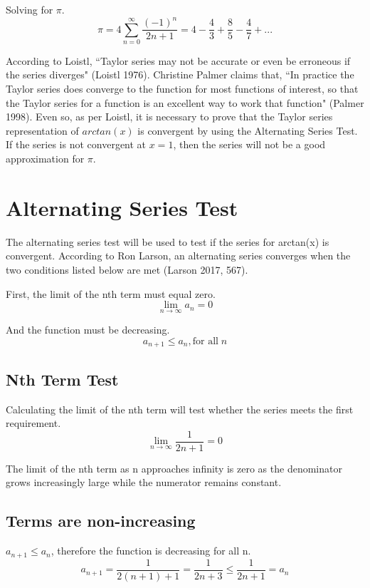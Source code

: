 \documentclass[12pt, titlepage]{article}
\begin{document}
Solving for \(\pi\).
\begin{equation*}
    \pi = 4 \sum_{n=0}^\infty{ \frac{(-1)^n}{2n+1} = 4 - \frac{4}{3} + \frac{8}{5} - \frac{4}{7} + ... }
\end{equation*}

According to Loistl, ``Taylor series may not be accurate or even be erroneous if the series diverges" (Loistl 1976). Christine Palmer claims that, ``In practice the Taylor series does converge to the function for most functions of interest, so that the Taylor series for a function is an excellent way to work that function" (Palmer 1998). Even so, as per Loistl, it is necessary to prove that the Taylor series representation of \(arctan(x)\) is convergent by using the Alternating Series Test. If the series is not convergent at \(x = 1\), then the series will not be a good approximation for \(\pi\).

\section{Alternating Series Test}
The alternating series test will be used to test if the series for arctan(x) is convergent. According to Ron Larson, an alternating series converges when the two conditions listed below are met (Larson 2017, 567).

First, the limit of the nth term must equal zero.
\begin{equation*}
    \lim_{n \to \infty} a_{n} = 0
\end{equation*}

And the function must be decreasing.
\begin{equation*}
    a_{n+1} \leq a_{n}, \textrm{for all} \; n
\end{equation*}

\subsection{Nth Term Test}
Calculating the limit of the nth term will test whether the series meets the first requirement.
\begin{equation*}
    \lim_{n \to \infty} \frac{1}{2n+1} = 0     
\end{equation*}

The limit of the nth term as n approaches infinity is zero as the denominator grows increasingly large while the numerator remains constant.

\subsection{Terms are non-increasing}
\(a_{n+1} \leq a_{n}\), therefore the function is decreasing for all n. 
\begin{equation*}
    a_{n+1} = \frac{1}{2(n+1) + 1} = \frac{1}{2n+3} \leq \frac{1}{2n+1} = a_{n}
\end{equation*}
\end{document}
